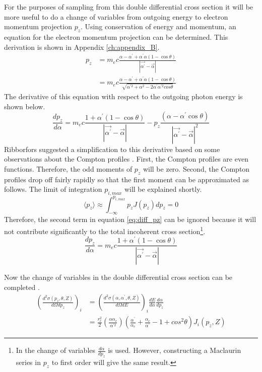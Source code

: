 For the purposes of sampling from this double differential cross section it
will be more useful to do a change of variables from outgoing energy to 
electron momentum projection $p_z$. Using conservation of energy and momentum,
an equation for the electron momentum projection can be determined. This
derivation is shown in Appendix \ref{ch:appendix_B}. 
\begin{align}
  p_z & = m_ec \frac{\alpha - \alpha^{'} + \alpha^{'}\alpha(1 - \cos{\theta})}
  {\left|\vec{\alpha^{'}} - \vec{\alpha}\right|} \nonumber \\
  & = m_ec \frac{\alpha - \alpha^{'} + \alpha^{'}\alpha(1 - \cos{\theta})}
  {\sqrt{\alpha^{'2} + \alpha^{2} - 2\alpha^{'}\alpha^{'2}cos{\theta}}}
  \label{eq:pz}
\end{align}
The derivative of this equation with respect to the outgoing photon energy
is shown below.
\begin{equation}
  \frac{dp_z}{d\alpha} = m_ec \frac{1 + \alpha^{'}(1-\cos{\theta})}
  {\left|\vec{\alpha^{'}} - \vec{\alpha} \right|} - 
  p_z \frac{\left(\alpha - \alpha^{'}\cos{\theta} \right)}
  {\left|\vec{\alpha^{'}} - \vec{\alpha} \right|^2}
  \label{eq:diff_pz}
\end{equation}
Ribborfors suggested a simplification to this derivative based on some 
observations about the Compton profiles \citep{ribberfors_x-ray_1983}. First, 
the Compton profiles are even functions. Therefore, the odd moments of $p_z$ 
will be zero. Second, the Compton profiles drop off fairly rapidly so that
the first moment can be approximated as follows. The limit of integration
$p_{i,max}$ will be explained shortly.
\begin{equation}
  \langle p_z \rangle \approx \int_{-\infty}^{p_{i,max}} p_z J(p_z)dp_z = 0
\end{equation}
Therefore, the second term in equation \ref{eq:diff_pz} can be ignored because
it will not contribute significantly to the total incoherent cross section\footnote{In the change of variables $\frac{d\alpha}{dp_z}$ is used. However, 
constructing a Maclaurin series in $p_z$ to first order will give the same result.}.
\begin{equation}
  \frac{dp_z}{d\alpha} = m_ec \frac{1 + \alpha^{'}(1-\cos{\theta})}
  {\left|\vec{\alpha^{'}} - \vec{\alpha} \right|}
  \label{eq:diff_pz_simp}
\end{equation}

Now the change of variables in the double differential cross section can be
completed \citep{ribberfors_x-ray_1983}.
\begin{align}
  \left(\frac{d^2\sigma(p_z,\theta,Z)}{d\Omega dp_z}\right)_i & = 
  \left(\frac{d^2\sigma(\alpha,\alpha^{'},\theta,Z)}{d\Omega dE}\right)_i 
  \frac{dE}{d\alpha}
  \frac{d\alpha}{dp_z} \nonumber \\ 
  & =  \frac{r_e^2}{2} \left(\frac{\alpha\alpha_c}{\alpha^{'2}}\right) 
  \left(\frac{\alpha^{'}}{\alpha_c} + \frac{\alpha_c}{\alpha^{'}} - 1 + 
  cos^2\theta \right) J_i(p_z,Z)
\end{align}


